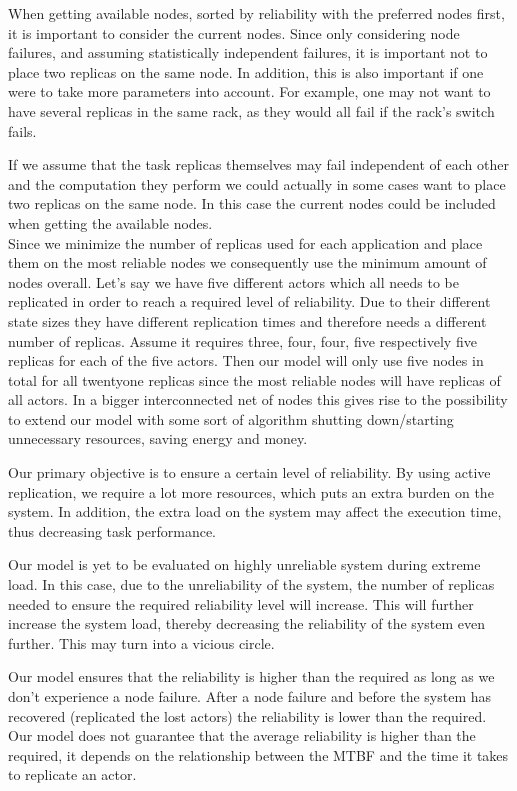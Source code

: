 \documentclass{cslthse-msc}
\begin{document}
When getting available nodes, sorted by reliability with the preferred nodes first, it is important to consider the current nodes. Since only considering node failures, and assuming statistically independent failures, it is important not to place two replicas on the same node. In addition, this is also important if one were to take more parameters into account. For example, one may not want to have several replicas in the same rack, as they would all fail if the rack's switch fails.

If we assume that the task replicas themselves may fail independent of each other and the computation they perform we could actually in some cases want to place two replicas on the same node. In this case the current nodes could be included when getting the available nodes.
\\

Since we minimize the number of replicas used for each application and place them on the most reliable nodes we consequently use the minimum amount of nodes overall. Let's say we have five different actors which all needs to be replicated in order to reach a required level of reliability. Due to their different state sizes they have different replication times and therefore needs a different number of replicas. Assume it requires three, four, four, five respectively five replicas for each of the five actors. Then our model will only use five nodes in total for all twentyone replicas since the most reliable nodes will have replicas of all actors. In a bigger interconnected net of nodes this gives rise to the possibility to extend our model with some sort of algorithm shutting down/starting unnecessary resources, saving energy and money.

Our primary objective is to ensure a certain level of reliability. By using active replication, we require a lot more resources, which puts an extra burden on the system. In addition, the extra load on the system may affect the execution time, thus decreasing task performance.

Our model is yet to be evaluated on highly unreliable system during extreme load. In this case, due to the unreliability of the system, the number of replicas needed to ensure the required reliability level will increase. This will further increase the system load, thereby decreasing the reliability of the system even further. This may turn into a vicious circle.

Our model ensures that the reliability is higher than the required as long as we don't experience a node failure. After a node failure and before the system has recovered (replicated the lost actors) the reliability is lower than the required. Our model does not guarantee that the average reliability is higher than the required, it depends on the relationship between the MTBF and the time it takes to replicate an actor.
\end{document}
